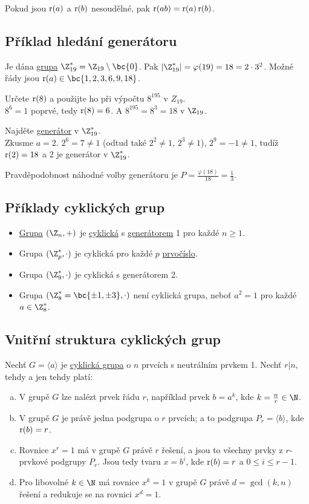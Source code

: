Pokud jsou $\operatorname*{r}(a)$ a $\operatorname*{r}(b)$ nesoudělné, pak $\operatorname*{r}(ab) = \operatorname*{r}(a) \operatorname*{r}(b)$.

\subsection{Příklad hledání generátoru}
Je dána \hyperref[grupa]{grupa} $\Z_{19}^* = \Z_{19} \setminus \bc{0}$. Pak $|\Z_{19}^*| = \varphi(19) = 18 = 2 \cdot 3^2$. Možné řády jsou $\ra(a) \in \bc{1, 2, 3, 6, 9, 18}$.

Určete $\operatorname*{r}(8)$ a použijte ho při výpočtu $8^{195}$ v $Z_{19}$.\\
$8^6 = 1$ poprvé, tedy $\operatorname*{r}(8) = 6$. A $8^{195} = 8^3 = 18$ v $\Z_{19}$.

Najděte \hyperref[generator]{generátor} v $\Z_{19}^*$.\\
Zkusme $a=2$. $2^6 = 7 \not=1$ (odtud také $2^2 \not=1$, $2^3 \not=1$), $2^9 = -1 \not=1$, tudíž $\operatorname*{r}(2)=18$ a $2$ je generátor v $\Z_{19}^*$.

Pravděpodobnost náhodné volby generátoru je $P = \frac{\varphi(18)}{18} = \frac{1}{3}$.

\subsection{Příklady cyklických grup}
\vspace{-1em}
\begin{itemize}
	\item \hyperref[grupa]{Grupa} $(\Z_n, +)$ je \hyperref[cyklGrupa]{cyklická} s \hyperref[generator]{generátorem} 1 pro každé $n \geq 1$.
	\item Grupa $(\Z_p^*, \cdot)$ je cyklická pro každé $p$ \hyperref[prvocislo]{prvočíslo}. 
	\item Grupa $(\Z_9^*, \cdot)$ je cyklická s generátorem 2. 
	\item Grupa $(\Z_8^* = \bc{\pm1, \pm3}, \cdot)$ není cyklická grupa, neboť $a^2 = 1$ pro každé $a \in \Z_8^*$. 
\end{itemize}

\subsection{Vnitřní struktura cyklických grup}
Nechť $G = \langle a \rangle$ je \hyperref[cyklGrupa]{cyklická grupa} o $n$ prvcích s neutrálním prvkem 1. Nechť $r | n$, tehdy a jen tehdy platí:
\vspace{-1em}
\begin{enumerate}[a)]
	\item V grupě $G$ lze nalézt prvek řádu $r$, například prvek $b = a^k$, kde $k = \frac{n}{r} \in \N$.
	\item V grupě $G$ je právě jedna podgrupa o $r$ prvcích; a to podgrupa $P_r = \langle b\rangle$, kde $\operatorname*{r}(b) = r$.
	\item Rovnice $x^r = 1$ má v grupě $G$ právě $r$ řešení, a jsou to všechny prvky z $r$-prvkové podgrupy $P_r$. Jsou tedy tvaru $x = b^i$, kde $\operatorname*{r}(b) = r$ a $0 \leq i \leq r-1$.
	\item Pro libovolné $k \in \N$ má rovnice $x^k = 1$ v grupě $G$ právě $d = \gcd(k, n)$ řešení a redukuje se na rovnici $x^d = 1$.
\end{enumerate}

